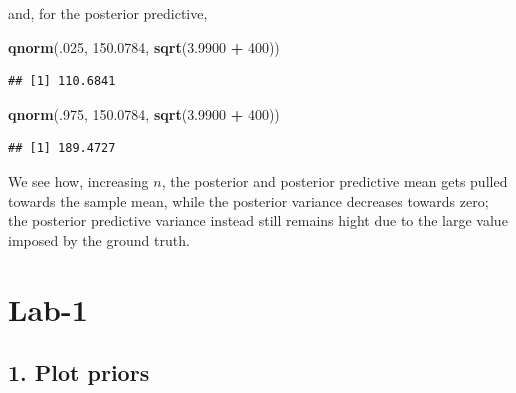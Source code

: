 \documentclass[]{article}
\newenvironment{Shaded}{\begin{snugshade}}{\end{snugshade}}
\newcommand{\KeywordTok}[1]{\textcolor[rgb]{0.13,0.29,0.53}{\textbf{#1}}}
\newcommand{\DecValTok}[1]{\textcolor[rgb]{0.00,0.00,0.81}{#1}}
\newcommand{\FloatTok}[1]{\textcolor[rgb]{0.00,0.00,0.81}{#1}}
\newcommand{\StringTok}[1]{\textcolor[rgb]{0.31,0.60,0.02}{#1}}
\newcommand{\OperatorTok}[1]{\textcolor[rgb]{0.81,0.36,0.00}{\textbf{#1}}}
\newcommand{\NormalTok}[1]{#1}
\begin{document}
and, for the posterior predictive,

\begin{Shaded}
\begin{Highlighting}[]
\KeywordTok{qnorm}\NormalTok{(.}\DecValTok{025}\NormalTok{, }\FloatTok{150.0784}\NormalTok{, }\KeywordTok{sqrt}\NormalTok{(}\FloatTok{3.9900} \OperatorTok{+}\StringTok{ }\DecValTok{400}\NormalTok{))}
\end{Highlighting}
\end{Shaded}

\begin{verbatim}
## [1] 110.6841
\end{verbatim}

\begin{Shaded}
\begin{Highlighting}[]
\KeywordTok{qnorm}\NormalTok{(.}\DecValTok{975}\NormalTok{, }\FloatTok{150.0784}\NormalTok{, }\KeywordTok{sqrt}\NormalTok{(}\FloatTok{3.9900} \OperatorTok{+}\StringTok{ }\DecValTok{400}\NormalTok{))}
\end{Highlighting}
\end{Shaded}

\begin{verbatim}
## [1] 189.4727
\end{verbatim}

We see how, increasing \(n\), the posterior and posterior predictive
mean gets pulled towards the sample mean, while the posterior variance
decreases towards zero; the posterior predictive variance instead still
remains hight due to the large value imposed by the ground truth.

\section{Lab-1}\label{lab-1}

\subsection{1. Plot priors}\label{plot-priors}
\end{document}

